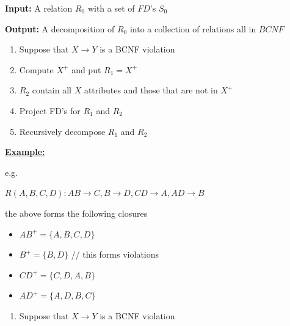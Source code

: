\documentclass[12pt]{article}
\begin{document}
\begin{enumerate}[1.]
\begin{itemize}
\begin{itemize}
            \bigskip

            \textbf{Input:} A relation $R_0$ with a set of $FD$'s $S_0$

            \bigskip

            \textbf{Output:} A decomposition of $R_0$ into a collection of relations all in $BCNF$

            \bigskip

            \begin{enumerate}[1.]
                \item Suppose that $X \to Y$ is a BCNF violation
                \item Compute $X^+$ and put $R_1 = X^+$
                \item $R_2$ contain all $X$ attributes and those that are not in $X^+$
                \item Project FD's for $R_1$ and $R_2$
                \item Recursively decompose $R_1$ and $R_2$
            \end{enumerate}

            \bigskip

            \underline{\textbf{Example:}}

            \bigskip

            e.g.


            \bigskip

            $R(A,B,C,D): AB \to C, B \to D, CD \to A, AD \to B$

            \bigskip

            the above forms the following closures

            \bigskip

            \begin{itemize}
                \item $AB^+ = \{A, B, C, D\}$
                \item $B^+ = \{B, D\}$ // this forms violations
                \item $CD^+ = \{C, D, A, B\}$
                \item $AD^+ = \{A, D, B, C\}$
            \end{itemize}

            \bigskip

            \begin{enumerate}[1.]
                \item Suppose that $X \to Y$ is a BCNF violation


\end{enumerate}
\end{itemize}
\end{itemize}
\end{enumerate}
\end{document}
